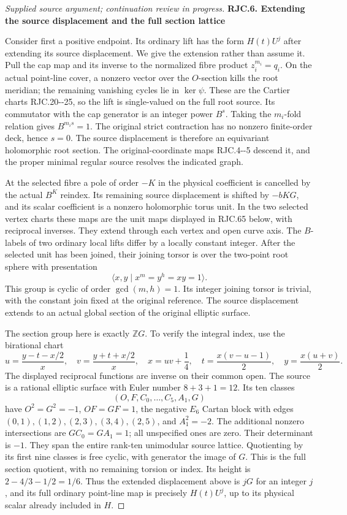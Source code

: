 \begin{proof}[Supplied source argument; continuation review in progress]
\medskip\noindent\textbf{RJC.6. Extending the source displacement and the full section lattice}

\par\nobreak

Consider first a positive endpoint. Its ordinary lift has the
form \(H(t)U^j\) after extending its source displacement.
We give the extension rather than assume it. Pull the cap
map and its inverse to the normalized fibre product
\(z_i^{m_i}=q_i\). On the actual point-line cover, a
nonzero vector over the \(O\)-section kills the root meridian;
the remaining vanishing cycles lie in \(\ker\psi\).
These are the Cartier charts RJC.20-\/-25, so the lift is
single-valued on the full root source.
Its commutator with the cap generator is an integer power
\(B^s\). Taking the \(m_i\)-fold relation gives
\(B^{m_i s}=1\). The original strict contraction has no
nonzero finite-order deck, hence \(s=0\).
The source displacement is therefore an equivariant
holomorphic root section. The original-coordinate maps
RJC.4-\/-5 descend it, and the proper minimal regular
source resolves the indicated graph.

At the selected fibre a pole of order \(-K\) in the
physical coefficient is cancelled by the actual \(B^K\)
reindex. Its remaining source displacement is shifted by
\(-bKG\), and its scalar coefficient is a nonzero
holomorphic torus unit. In the two selected vertex
charts these maps are the unit maps displayed in
RJC.65 below, with reciprocal inverses.
They extend through each vertex and open curve axis.
The \(B\)-labels of two ordinary local lifts differ by
a locally constant integer. After the selected unit
has been joined, their joining torsor is over the
two-point root sphere with presentation
\[
 \langle x,y\mid x^m=y^h=xy=1\rangle.
 \tag{RJC.51}
\]
This group is cyclic of order \(\gcd(m,h)=1\).
Its integer joining torsor is trivial, with the
constant join fixed at the original reference.
The source displacement extends to an actual global
section of the original elliptic surface.

The section group here is exactly \(\mathbb ZG\).
To verify the integral index, use the birational chart
\[
 u=\frac{y-t-x/2}{x},\quad
 v=\frac{y+t+x/2}{x},\quad
 x=uv+\frac14,\quad
 t=\frac{x(v-u-1)}2,\quad
 y=\frac{x(u+v)}2.
 \tag{RJC.52}
\]
The displayed reciprocal functions are inverse on their
common open. The source is a rational elliptic surface
with Euler number \(8+3+1=12\).
Its ten classes
\[
 (O,F,C_0,\ldots,C_5,A_1,G)
 \tag{RJC.53}
\]
have \(O^2=G^2=-1\), \(OF=GF=1\),
the negative \(E_6\) Cartan block with edges
\((0,1),(1,2),(2,3),(3,4),(2,5)\), and \(A_1^2=-2\).
The additional nonzero intersections are
\(G C_0=G A_1=1\); all unspecified ones are zero.
Their determinant is \(-1\).
They span the entire rank-ten unimodular source lattice.
Quotienting by its first nine classes is free cyclic,
with generator the image of \(G\). This is the full
section quotient, with no remaining torsion or index.
Its height is
\(2-4/3-1/2=1/6\).
Thus the extended displacement above is \(jG\) for
an integer \(j\), and its full ordinary point-line
map is precisely \(H(t)U^j\), up to its physical
scalar already included in \(H\).


\end{proof}

